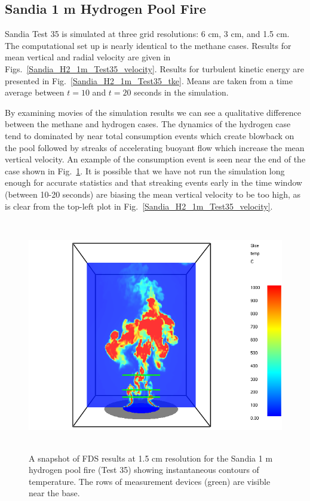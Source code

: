 \clearpage

\subsection{Sandia 1 m Hydrogen Pool Fire}
\label{Sandia_hydrogen}

Sandia Test 35 \cite{Tieszen:2004} is simulated at three grid resolutions: 6 cm, 3 cm, and 1.5 cm.  The computational set up is nearly identical to the methane cases.  Results for mean vertical and radial velocity are given in Figs.~\ref{Sandia_H2_1m_Test35_velocity}.  Results for turbulent kinetic energy are presented in Fig.~\ref{Sandia_H2_1m_Test35_tke}.  Means are taken from a time average between $t=10$ and $t=20$ seconds in the simulation.

By examining movies of the simulation results we can see a qualitative difference between the methane and hydrogen cases.  The dynamics of the hydrogen case tend to dominated by near total consumption events which create blowback on the pool followed by streaks of accelerating buoyant flow which increase the mean vertical velocity.  An example of the consumption event is seen near the end of the case shown in Fig.~\ref{Sandia_H2_1m_image}.  It is possible that we have not run the simulation long enough for accurate statistics and that streaking events early in the time window (between 10-20 seconds) are biasing the mean vertical velocity to be too high, as is clear from the top-left plot in Fig.~\ref{Sandia_H2_1m_Test35_velocity}.

\begin{figure}[h]
\begin{center}
\includegraphics[height=4in]{FIGURES/Sandia_Plumes/Sandia_H2_1m_image}
\caption[Sandia 1~m hydrogen pool fire instantaneous temperature contours]{A snapshot of FDS results at 1.5 cm resolution for the Sandia 1 m hydrogen pool fire (Test 35) showing instantaneous contours of temperature.  The rows of measurement devices (green) are visible near the base.}
\label{Sandia_H2_1m_image}
\end{center}
\end{figure}

